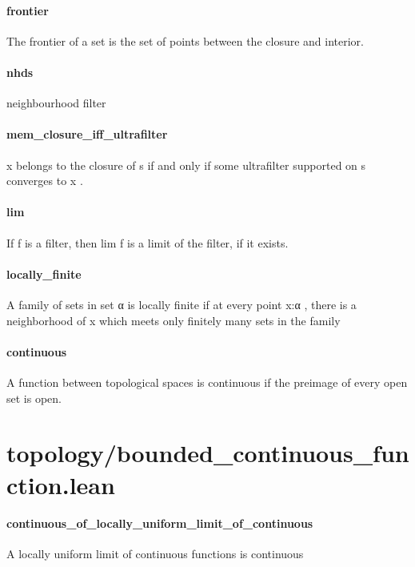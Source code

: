 \documentclass{article}
\begin{document}
\paragraph{frontier}
\par
The frontier of a set is the set of points between the closure and interior.
\paragraph{nhds}
\par
neighbourhood filter
\paragraph{mem\_closure\_iff\_ultrafilter}
\par
\colorbox[RGB]{253,246,227}{{{{\color[RGB]{101, 123, 131} x }}}} belongs to the closure of 
\colorbox[RGB]{253,246,227}{{{{\color[RGB]{101, 123, 131} s }}}} if and only if some ultrafilter
supported on 
\colorbox[RGB]{253,246,227}{{{{\color[RGB]{101, 123, 131} s }}}} converges to 
\colorbox[RGB]{253,246,227}{{{{\color[RGB]{101, 123, 131} x }}}}.
\paragraph{lim}
\par
If 
\colorbox[RGB]{253,246,227}{{{{\color[RGB]{101, 123, 131} f }}}} is a filter, then 
\colorbox[RGB]{253,246,227}{{{{\color[RGB]{101, 123, 131} lim f }}}} is a limit of the filter, if it exists.
\paragraph{locally\_finite}
\par
A family of sets in 
\colorbox[RGB]{253,246,227}{{{{\color[RGB]{101, 123, 131} set α }}}} is locally finite if at every point 
\colorbox[RGB]{253,246,227}{{{{\color[RGB]{101, 123, 131} x:α }}}},
there is a neighborhood of 
\colorbox[RGB]{253,246,227}{{{{\color[RGB]{101, 123, 131} x }}}} which meets only finitely many sets in the family
\paragraph{continuous}
\par
A function between topological spaces is continuous if the preimage
of every open set is open.
\section{topology/bounded\_continuous\_function.lean}\paragraph{continuous\_of\_locally\_uniform\_limit\_of\_continuous}
\par
A locally uniform limit of continuous functions is continuous
\end{document}
